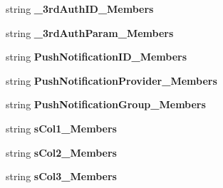 \begin{DoxyCompactItemize}
\item 
string {\bfseries \+\_\+3rd\+Auth\+I\+D\+\_\+\+Members}\hypertarget{a00101_af0186fad045b59f4859e5bed4a696fa4}{}\label{a00101_af0186fad045b59f4859e5bed4a696fa4}

\item 
string {\bfseries \+\_\+3rd\+Auth\+Param\+\_\+\+Members}\hypertarget{a00101_ae58cfc031fb8f5bc9ca49256758227af}{}\label{a00101_ae58cfc031fb8f5bc9ca49256758227af}

\item 
string {\bfseries Push\+Notification\+I\+D\+\_\+\+Members}\hypertarget{a00101_afe3f437c4b7fdbe64a273c2c21a18ad4}{}\label{a00101_afe3f437c4b7fdbe64a273c2c21a18ad4}

\item 
string {\bfseries Push\+Notification\+Provider\+\_\+\+Members}\hypertarget{a00101_a975f29f5a360232d33e33ad3af6d1305}{}\label{a00101_a975f29f5a360232d33e33ad3af6d1305}

\item 
string {\bfseries Push\+Notification\+Group\+\_\+\+Members}\hypertarget{a00101_ac6a8959dc53b4a11406eb18d30c512c9}{}\label{a00101_ac6a8959dc53b4a11406eb18d30c512c9}

\item 
string {\bfseries s\+Col1\+\_\+\+Members}\hypertarget{a00101_a2125306b46b93637f5efeab496e8330a}{}\label{a00101_a2125306b46b93637f5efeab496e8330a}

\item 
string {\bfseries s\+Col2\+\_\+\+Members}\hypertarget{a00101_a7662c6eda24f768cd79a478746ab1593}{}\label{a00101_a7662c6eda24f768cd79a478746ab1593}

\item 
string {\bfseries s\+Col3\+\_\+\+Members}\hypertarget{a00101_af9232d77edeb208b887e27dc209ff5c3}{}\label{a00101_af9232d77edeb208b887e27dc209ff5c3}


\end{DoxyCompactItemize}
